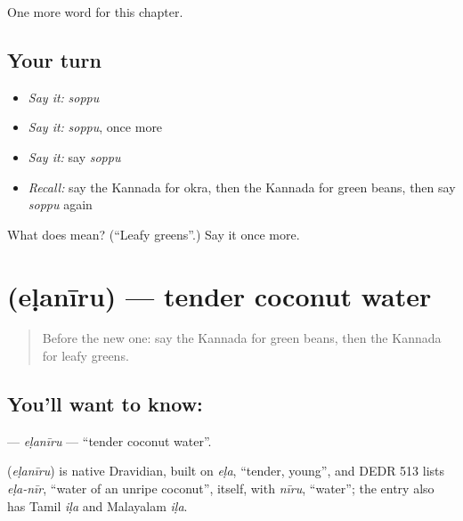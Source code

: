 \begin{grammarlens}[title={What you've built}]
One more word for this chapter.
\end{grammarlens}

\subsection*{Your turn}
\begin{itemize}
\raggedright
  \item \emph{Say it:} \emph{soppu}
  \item \emph{Say it:} \emph{soppu}, once more
  \item \emph{Say it:} say \emph{soppu}
  \item \emph{Recall:} say the Kannada for okra, then the Kannada for green beans, then say \emph{soppu} again
\end{itemize}

\begin{tcolorbox}[breakable,colback=teal!4,colframe=teal!35!black,title={Before you move on}]
What does  mean? (\textquotedblleft{}Leafy greens\textquotedblright{}.) Say it once more.
\end{tcolorbox}
\section[\texorpdfstring{\kn{ಎಳನೀರು} (eḷanīru)}{ಎಳನೀರು (eḷanīru)}]{ (eḷanīru) — tender coconut water}

\label{lesson:KA-C184-elaniru}



\begin{quote}
Before the new one: say the Kannada for green beans, then the Kannada for leafy greens.
\end{quote}

\subsection*{You'll want to know: }
\textbf{} — \emph{eḷanīru} — \textquotedblleft{}tender coconut water\textquotedblright{}.

\begin{cousinweb}
\textbf{} (\emph{eḷanīru}) is native Dravidian, built on \emph{eḷa}, \textquotedblleft{}tender, young\textquotedblright{}, and DEDR 513 lists \emph{eḷa-nīr}, \textquotedblleft{}water of an unripe coconut\textquotedblright{}, itself, with \emph{nīru}, \textquotedblleft{}water\textquotedblright{}; the entry also has Tamil \emph{iḷa} and Malayalam \emph{iḷa}.
\end{cousinweb}

